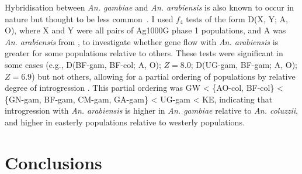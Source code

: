 \documentclass[a4paper,11pt,abstracton,hidelinks]{scrartcl}
\begin{document}
Hybridisation between \textit{An. gambiae} and \textit{An. arabiensis} is also known to occur in nature but thought to be less common~\parencite{White1971,Coluzzi1979,dellaTorre1997}.
%
I used $f_4$ tests of the form D(X, Y; A, O), where X and Y were all pairs of Ag1000G phase 1 populations, and A was \textit{An. arabiensis} from \textcite{Neafsey2015}, to investigate whether gene flow with \textit{An. arabiensis} is greater for some populations relative to others.
%
These tests were significant in some cases (e.g., D(BF-gam, BF-col; A, O); $Z=8.0$; D(UG-gam, BF-gam; A, O); $Z=6.9$) but not others, allowing for a partial ordering of populations by relative degree of introgression .
%
This partial ordering was GW < \{AO-col, BF-col\} < \{GN-gam, BF-gam, CM-gam, GA-gam\} < UG-gam < KE, indicating that introgression with \textit{An. arabiensis} is higher in \textit{An. gambiae} relative to \textit{An. coluzzii}, and higher in easterly populations relative to westerly populations.


\section{Conclusions}\label{sec:conclusions}
\end{document}
